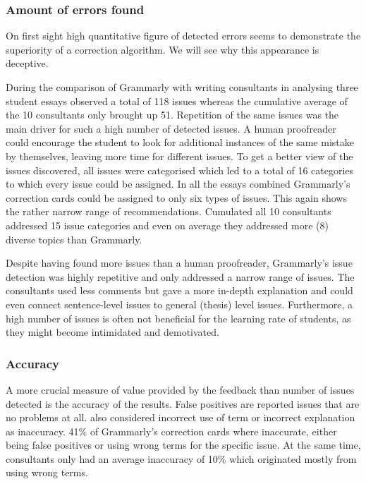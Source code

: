 \documentclass[runningheads]{llncs}
\begin{document}
\subsubsection{Amount of errors found}
On first sight high quantitative figure of detected errors seems to demonstrate the superiority of a correction algorithm. We will see why this appearance is deceptive.

During the comparison of Grammarly with writing consultants in analysing three student essays \textcite{dembsey_closing_2017} observed a total of 118 issues whereas the cumulative average of the 10 consultants only brought up 51. Repetition of the same issues was the main driver for such a high number of detected issues. A human proofreader could encourage the student to look for additional instances of the same mistake by themselves, leaving more time for different issues. To get a better view of the issues discovered, all issues were categorised which led to a total of 16 categories to which every issue could be assigned. In all the essays combined Grammarly's correction cards could be assigned to only six types of issues. This again shows the rather narrow range of recommendations. Cumulated all 10 consultants addressed 15 issue categories and even on average they addressed more (8) diverse topics than Grammarly.

Despite having found more issues than a human proofreader, Grammarly's issue detection was highly repetitive and only addressed a narrow range of issues. The consultants used less comments but gave a more in-depth explanation and could even connect sentence-level issues to general (thesis) level issues. Furthermore, a high number of issues is often not beneficial for the learning rate of students, as they might become intimidated and demotivated. 
\citep{dembsey_closing_2017}


\subsubsection{Accuracy}
A more crucial measure of value provided by the feedback than number of issues detected is the accuracy of the results. False positives are reported issues that are no problems at all. \textcite{dembsey_closing_2017} also considered incorrect use of term or incorrect explanation as inaccuracy. 41\% of Grammarly's correction cards where inaccurate, either being false positives or using wrong terms for the specific issue. At the same time, consultants only had an average inaccuracy of 10\% which originated mostly from using wrong terms.
\citep{dembsey_closing_2017}
\end{document}
